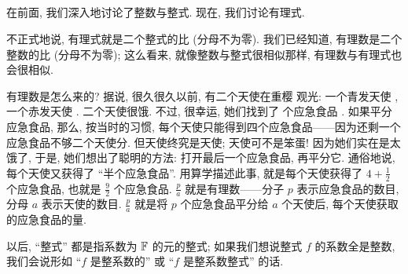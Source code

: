 \subsection*{\DefinitionOfRationalExpressions}
\markright{\DefinitionOfRationalExpressions}

在前面, 我们深入地讨论了整数与整式. 现在, 我们讨论有理式.

不正式地说, 有理式就是二个整式的比 (分母不为零). 我们已经知道, 有理数是二个整数的比 (分母不为零); 这么看来, 就像整数与整式很相似那样, 有理数与有理式也会很相似.

有理数是怎么来的? 据说, 很久很久以前, 有二个天使在重樱  观光: 一个青发天使 , 一个赤发天使 . 二个天使很饿. 不过, 很幸运, 她们找到了  个应急食品 . 如果平分应急食品, 那么, 按当时的习惯, 每个天使只能得到四个应急食品——因为还剩一个应急食品不够二个天使分. 但天使终究是天使; 天使可不是笨蛋! 因为她们实在是太饿了, 于是, 她们想出了聪明的方法: 打开最后一个应急食品, 再平分它. 通俗地说, 每个天使又获得了 ``半个应急食品''. 用算学描述此事, 就是每个天使获得了 $4 + \frac{1}{2}$ 个应急食品, 也就是 $\frac{9}{2}$ 个应急食品. $\frac{p}{a}$ 就是有理数——分子 $p$ 表示应急食品的数目, 分母 $a$ 表示天使的数目. $\frac{p}{a}$ 就是将 $p$ 个应急食品平分给 $a$ 个天使后, 每个天使获取的应急食品的量.

以后, ``整式'' 都是指系数为 $\mathbb{F}$ 的元的整式; 如果我们想说整式 $f$ 的系数全是整数, 我们会说形如 ``$f$ 是整系数的'' 或 ``$f$ 是整系数整式'' 的话.

